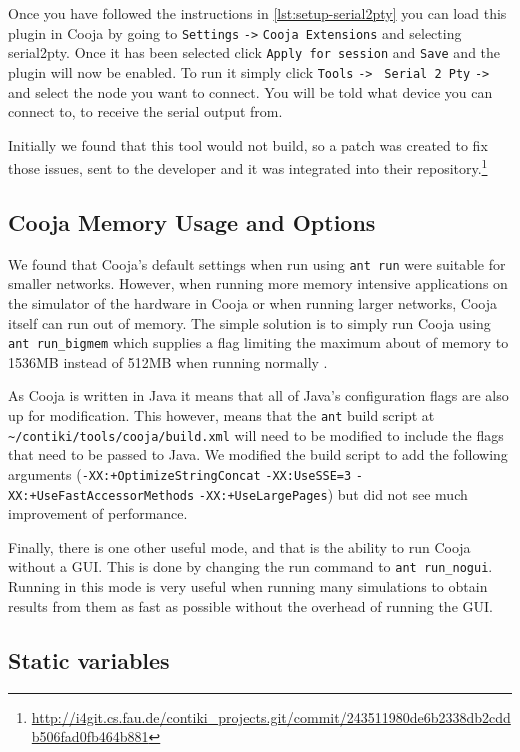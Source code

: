 Once you have followed the instructions in \autoref{lst:setup-serial2pty} you can load this plugin in Cooja by going to \verb|Settings| \verb|->| \verb|Cooja Extensions| and selecting serial2pty. Once it has been selected click \verb|Apply for session| and \verb|Save| and the plugin will now be enabled. To run it simply click \verb|Tools| \verb|->| \verb| Serial 2 Pty| \verb|->| and select the node you want to connect. You will be told what device you can connect to, to receive the serial output from.

Initially we found that this tool would not build, so a patch was created to fix those issues, sent to the developer and it was integrated into their repository.\footnote{\url{http://i4git.cs.fau.de/contiki\_projects.git/commit/243511980de6b2338db2cddb506fad0fb464b881}}

\subsection{Cooja Memory Usage  and Options}

We found that Cooja's default settings when run using \verb|ant run| were suitable for smaller networks. However, when running more memory intensive applications on the simulator of the hardware in Cooja or when running larger networks, Cooja itself can run out of memory. The simple solution is to simply run Cooja using \verb|ant run_bigmem| which supplies a flag limiting the maximum about of memory to 1536MB instead of 512MB when running normally \cite{?}.

As Cooja is written in Java \cite{?} it means that all of Java's configuration flags are also up for modification. This however, means that the \verb|ant| build script at \verb|~/contiki/tools/cooja/build.xml| will need to be modified to include the flags that need to be passed to Java. We modified the build script to add the following arguments (\verb|-XX:+OptimizeStringConcat| \verb|-XX:UseSSE=3| \verb|-XX:+UseFastAccessorMethods| \verb|-XX:+UseLargePages|) but did not see much improvement of performance.

Finally, there is one other useful mode, and that is the ability to run Cooja without a GUI. This is done by changing the run command to \verb|ant run_nogui|. Running in this mode is very useful when running many simulations to obtain results from them as fast as possible without the overhead of running the GUI.


\subsection{Static variables}

